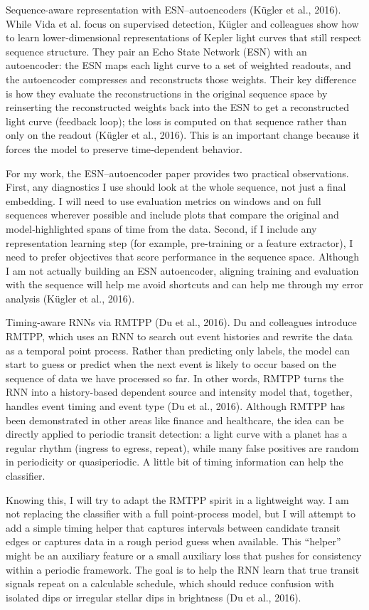 \documentclass[letterpaper]{article}
\begin{document}
Sequence-aware representation with ESN–autoencoders (Kügler et al., 2016). While Vida et al. focus on supervised detection, Kügler and colleagues show how to learn lower‑dimensional representations of Kepler light curves that still respect sequence structure. They pair an Echo State Network (ESN) with an autoencoder: the ESN maps each light curve to a set of weighted readouts, and the autoencoder compresses and reconstructs those weights. Their key difference is how they evaluate the reconstructions in the original sequence space by reinserting the reconstructed weights back into the ESN to get a reconstructed light curve (feedback loop); the loss is computed on that sequence rather than only on the readout (Kügler et al., 2016). This is an important change because it forces the model to preserve time‑dependent behavior.

For my work, the ESN–autoencoder paper provides two practical observations. First, any diagnostics I use should look at the whole sequence, not just a final embedding. I will need to use evaluation metrics on windows and on full sequences wherever possible and include plots that compare the original and model‑highlighted spans of time from the data. Second, if I include any representation learning step (for example, pre-training or a feature extractor), I need to prefer objectives that score performance in the sequence space. Although I am not actually building an ESN autoencoder, aligning training and evaluation with the sequence will help me avoid shortcuts and can help me through my error analysis (Kügler et al., 2016).

Timing-aware RNNs via RMTPP (Du et al., 2016). Du and colleagues introduce RMTPP, which uses an RNN to search out event histories and rewrite the data as a temporal point process. Rather than predicting only labels, the model can start to guess or predict when the next event is likely to occur based on the sequence of data we have processed so far. In other words, RMTPP turns the RNN into a history-based dependent source and intensity model that, together, handles event timing and event type (Du et al., 2016). Although RMTPP has been demonstrated in other areas like finance and healthcare, the idea can be directly applied to periodic transit detection: a light curve with a planet has a regular rhythm (ingress to egress, repeat), while many false positives are random in periodicity or quasiperiodic. A little bit of timing information can help the classifier.

Knowing this, I will try to adapt the RMTPP spirit in a lightweight way. I am not replacing the classifier with a full point‑process model, but I will attempt to add a simple timing helper that captures intervals between candidate transit edges or captures data in a rough period guess when available. This “helper” might be an auxiliary feature or a small auxiliary loss that pushes for consistency within a periodic framework. The goal is to help the RNN learn that true transit signals repeat on a calculable schedule, which should reduce confusion with isolated dips or irregular stellar dips in brightness (Du et al., 2016).
\end{document}
